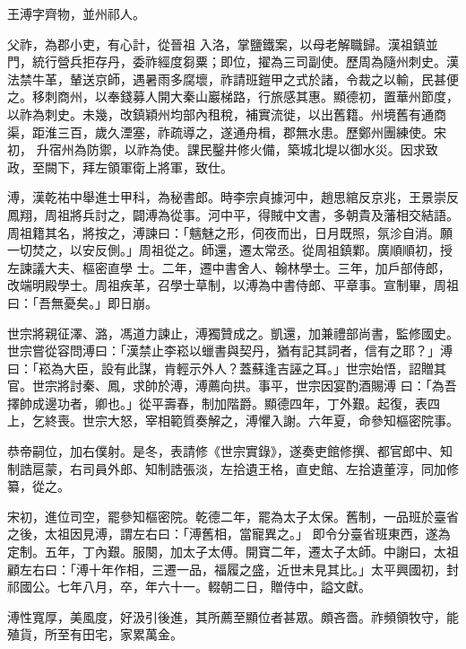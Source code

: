 \begin{pinyinscope}
 王溥字齊物，並州祁人。



 父祚，為郡小吏，有心計，從晉祖
 入洛，掌鹽鐵案，以母老解職歸。漢祖鎮並門，統行營兵拒存丹，委祚經度芻粟；即位，擢為三司副使。歷周為隨州刺史。漢法禁牛革，輦送京師，遇暑雨多腐壞，祚請班鎧甲之式於諸，令裁之以輸，民甚便之。移刺商州，以奉錢募人開大秦山巖梯路，行旅感其惠。顯德初，置華州節度，以祚為刺史。未幾，改鎮穎州均部內租稅，補實流徙，以出舊籍。州境舊有通商渠，距淮三百，歲久湮塞，祚疏導之，遂通舟楫，郡無水患。歷鄭州團練使。宋初，
 升宿州為防禦，以祚為使。課民鑿井修火備，築城北堤以御水災。因求致政，至闕下，拜左領軍衛上將軍，致仕。



 溥，漢乾祐中舉進士甲科，為秘書郎。時李宗貞據河中，趙思綰反京兆，王景崇反鳳翔，周祖將兵討之，闢溥為從事。河中平，得賊中文書，多朝貴及藩相交結語。周祖籍其名，將按之，溥諫曰：「魑魅之形，伺夜而出，日月既照，氛沴自消。願一切焚之，以安反側。」周祖從之。師還，遷太常丞。從周祖鎮鄴。廣順順初，授左諫議大夫、樞密直學
 士。二年，遷中書舍人、翰林學士。三年，加戶部侍郎，改端明殿學士。周祖疾革，召學士草制，以溥為中書侍郎、平章事。宣制畢，周祖曰：「吾無憂矣。」即日崩。



 世宗將親征澤、潞，馮道力諫止，溥獨贊成之。凱還，加兼禮部尚書，監修國史。世宗嘗從容問溥曰：「漢禁止李崧以蠟書與契丹，猶有記其詞者，信有之耶？」溥曰：「崧為大臣，設有此謀，肯輕示外人？蓋蘇逢吉誣之耳。」世宗始悟，詔贈其官。世宗將討秦、鳳，求帥於溥，溥薦向拱。事平，世宗因宴酌酒賜溥
 曰：「為吾擇帥成邊功者，卿也。」從平壽春，制加階爵。顯德四年，丁外艱。起復，表四上，乞終喪。世宗大怒，宰相範質奏解之，溥懼入謝。六年夏，命參知樞密院事。



 恭帝嗣位，加右僕射。是冬，表請修《世宗實錄》，遂奏吏館修撰、都官郎中、知制誥扈蒙，右司員外郎、知制誥張淡，左拾遺王格，直史館、左拾遺董淳，同加修纂，從之。



 宋初，進位司空，罷參知樞密院。乾德二年，罷為太子太保。舊制，一品班於臺省之後，太祖因見溥，謂左右曰：「溥舊相，當寵異之。」
 即令分臺省班東西，遂為定制。五年，丁內艱。服闋，加太子太傅。開寶二年，遷太子太師。中謝曰，太祖顧左右曰：「溥十年作相，三遷一品，福履之盛，近世未見其比。」太平興國初，封祁國公。七年八月，卒，年六十一。輟朝二日，贈侍中，謚文獻。



 溥性寬厚，美風度，好汲引後進，其所薦至顯位者甚眾。頗吝嗇。祚頻領牧守，能殖貨，所至有田宅，家累萬金。




\end{pinyinscope}
